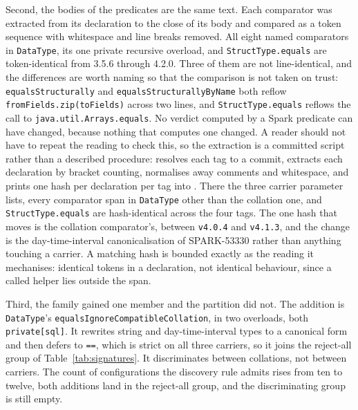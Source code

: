 Second, the bodies of the predicates are the same text. Each comparator was extracted from its declaration to the close of its body and compared as a token sequence with whitespace and line breaks removed. All eight named comparators in \texttt{DataType}, its one private recursive overload, and \texttt{StructType.equals} are token-identical from 3.5.6 through 4.2.0. Three of them are not line-identical, and the differences are worth naming so that the comparison is not taken on trust: \texttt{equalsStructurally} and \texttt{equalsStructurallyByName} both reflow \texttt{fromFields.zip(toFields)} across two lines, and \texttt{StructType.equals} reflows the call to \texttt{java.util.Arrays.equals}. No verdict computed by a Spark predicate can have changed, because nothing that computes one changed. A reader should not have to repeat the reading to check this, so the extraction is a committed script rather than a described procedure:  resolves each tag to a commit, extracts each declaration by bracket counting, normalises away comments and whitespace, and prints one hash per declaration per tag into . There the three carrier parameter lists, every comparator span in \texttt{DataType} other than the collation one, and \texttt{StructType.equals} are hash-identical across the four tags. The one hash that moves is the collation comparator's, between \texttt{v4.0.4} and \texttt{v4.1.3}, and the change is the day-time-interval canonicalisation of SPARK-53330 rather than anything touching a carrier. A matching hash is bounded exactly as the reading it mechanises: identical tokens in a declaration, not identical behaviour, since a called helper lies outside the span.

Third, the family gained one member and the partition did not. The addition is \texttt{DataType}'s \texttt{equals\allowbreak Ignore\allowbreak Compatible\allowbreak Collation}, in two overloads, both \texttt{private[sql]}. It rewrites string and day-time-interval types to a canonical form and then defers to \texttt{==}, which is strict on all three carriers, so it joins the reject-all group of Table~\ref{tab:signatures}. It discriminates between collations, not between carriers. The count of configurations the discovery rule admits rises from ten to twelve, both additions land in the reject-all group, and the discriminating group is still empty.

